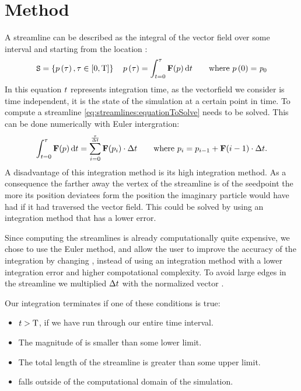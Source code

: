 \section{Method}
\label{s:streamlines:method}

A streamline can be described as the integral of the vector field \vectorFieldCont{\integrationTime} over some interval \timeInterval and starting from the location :
%
\begin{equation}
\label{eq:streamlines:equationToSolve}
	\mathtt{S} = 
		\left\{ p\left(\tau\right), \tau \in [0, \text{T}]\right\} 
		\quad 
		p\left(\tau\right) = \int_{t = 0}^{\tau} \mathbf{F}\!\left(p\right) \operatorname{d}\!{t} 
		\quad\quad 
		\text{where } p\left(0\right) = \mathit{p}_{0}
\end{equation}
%
In this equation $t$ represents integration time, as the vectorfield we consider is time independent, \ie it is the state of the simulation at a certain point in time. To compute a streamline \cref{eq:streamlines:equationToSolve} needs to be solved. This can be done numerically with Euler intergration:
\begin{align}
	\int_{t = 0}^{\tau} \mathbf{F}\!\left(p\right) \operatorname{d}\!{t}	 
	=  
	\sum_{i = 0}^{\frac{\tau}{\Delta t}} \mathbf{F}\!\left(p_{i}\right) \cdot \Delta t \quad \quad \text{where } p_{i} = p_{i - 1} + \mathbf{F}\!\left(i - 1\right) \cdot \Delta t.
\end{align}
A disadvantage of this integration method is its high integration method. As a consequence the farther away the vertex of the streamline is of the seedpoint the more its position deviatees form the position the imaginary particle would have had if it had traversed the vector field. This could be solved by using an integration method that has a lower error. 

Since computing the streamlines is already computationally quite expensive, we chose to use the Euler method, and allow the user to improve the accuracy of the integration by changing \integrationTime, instead of using an integration method with a lower integration error and higher compotational complexity. To avoid large edges in the streamline we multiplied $\Delta t$ with the normalized vector \cite{telea2014data}. 

Our integration terminates if one of these conditions is true:
\begin{itemize}
	\item $t > \text{T}$, \ie if we have run through our entire time interval.
	\item The magnitude of  is smaller than some lower limit.
	\item The total length of the streamline is greater than some upper limit.
	\item {} falls outside of the computational domain of the simulation.
\end{itemize}